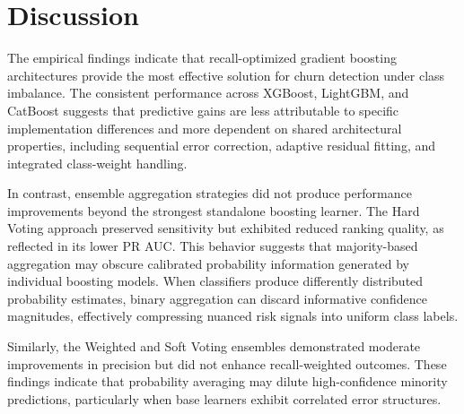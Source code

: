 \documentclass[a4paper,twoside]{article}
\begin{document}
\begin{table}[H]
\caption{Base Model Contribution to Ensemble Predictions (Mean $|SHAP|$)}
\label{tab:ensemble_shap}
\centering
{}
\end{table}

\section{Discussion}

The empirical findings indicate that recall-optimized gradient boosting architectures provide the most effective solution for churn detection under class imbalance. The consistent performance across XGBoost, LightGBM, and CatBoost suggests that predictive gains are less attributable to specific implementation differences and more dependent on shared architectural properties, including sequential error correction, adaptive residual fitting, and integrated class-weight handling.

In contrast, ensemble aggregation strategies did not produce performance improvements beyond the strongest standalone boosting learner. The Hard Voting approach preserved sensitivity but exhibited reduced ranking quality, as reflected in its lower PR AUC. This behavior suggests that majority-based aggregation may obscure calibrated probability information generated by individual boosting models. When classifiers produce differently distributed probability estimates, binary aggregation can discard informative confidence magnitudes, effectively compressing nuanced risk signals into uniform class labels.

Similarly, the Weighted and Soft Voting ensembles demonstrated moderate improvements in precision but did not enhance recall-weighted outcomes. These findings indicate that probability averaging may dilute high-confidence minority predictions, particularly when base learners exhibit correlated error structures.
\end{document}
